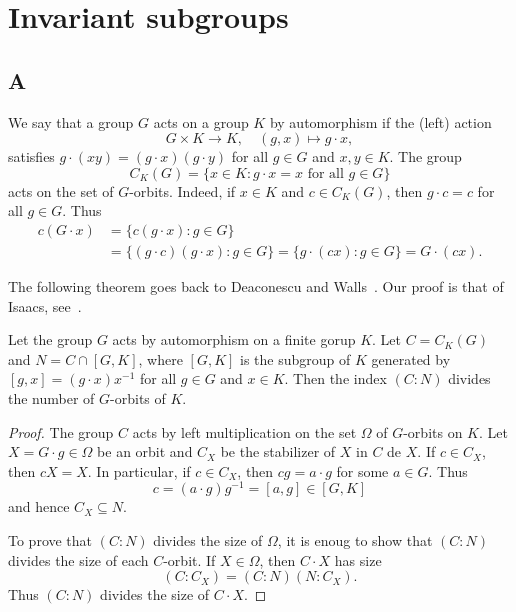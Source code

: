 \chapter{Invariant subgroups}

\section*{A}

We say that a group $G$ acts on a group $K$ by automorphism if the (left) action
\[
G\times K\to K,
\quad
(g,x)\mapsto g\cdot x,
\]
satisfies $g\cdot (xy)=(g\cdot x)(g\cdot y)$ 
for all $g\in G$ and $x,y\in K$. 
The group 
\[
C_{K}(G)=\{x\in K:g\cdot x=x\text{ for all }g\in G\}
\]
acts on the 
set of $G$-orbits. Indeed, if $x\in K$ and $c\in C_K(G)$, then $g\cdot c=c$ for all $g\in G$. Thus  
\begin{align*}
  c(G\cdot x)
  &=\{c(g\cdot x):g\in G\}\\
  &=\{(g\cdot c)(g\cdot x):g\in G\}
  =\{g\cdot (cx):g\in G\}
  =G\cdot (cx).
\end{align*}

The following theorem goes back to Deaconescu and Walls~\cite{MR2164558}. 
Our proof is that of Isaacs, see~\cite{MR2922681}. 

\begin{theorem}
	\label{thm:DeaconescuWalls}
	Let the group $G$ acts by automorphism on a finite gorup $K$. Let
	$C=C_{K}(G)$ and $N=C\cap [G,K]$,
	where $[G,K]$ is the subgroup of $K$ generated by $[g,x]=(g\cdot x)x^{-1}$ for all
	$g\in G$ and $x\in K$. Then the index $(C:N)$ divides the number of $G$-orbits of 
	$K$. 
\end{theorem}

%

\begin{proof}
  The group $C$ acts by left multiplication on the set $\Omega$ of
  $G$-orbits on $K$. Let $X=G\cdot g\in\Omega$ be an orbit and $C_X$ be the stabilizer of $X$ 
  in $C$ de $X$. If $c\in C_X$, then $cX=X$. In particular, if $c\in C_X$, then 
  $cg=a\cdot g$ for some $a\in G$. Thus 
  \[
  c=(a\cdot
  g)g^{-1}=[a,g]\in [G,K]
  \]
  and hence $C_X\subseteq N$.

  To prove that $(C:N)$ divides the size of $\Omega$, it is enoug to show that 
  $(C:N)$ divides the size of each $C$-orbit. If $X\in\Omega$, then $C\cdot
  X$ has size 
  \[
	(C:C_X)=(C:N)(N:C_X).
  \]
  Thus  $(C:N)$ divides the size of $C\cdot X$.
\end{proof}

